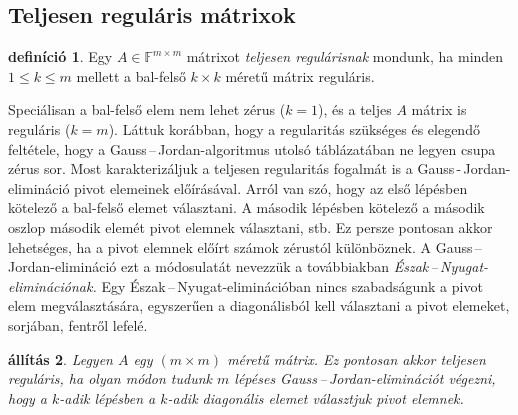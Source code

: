 \documentclass[a4paper, showtrims]{memoir}
\theoremstyle{plain}
\newtheorem{proposition}{állítás}[chapter]
\theoremstyle{remark}
\theoremstyle{definition}
\newtheorem{definition}[proposition]{definíció}
\begin{document}
\subsection{Teljesen reguláris mátrixok}
\begin{definition}\label{def:t-reg}
    Egy $A\in\mathbb{F}^{m\times m}$ mátrixot \emph{teljesen regulárisnak} mondunk,
    ha minden $1\leq k\leq m$ mellett a bal-felső $k\times k$ méretű mátrix reguláris.
\end{definition}
Speciálisan a bal-felső elem nem lehet zérus ($k=1$), és a teljes $A$ mátrix is reguláris ($k=m$).
Láttuk korábban, hogy a regularitás szükséges és elegendő feltétele, hogy a Gauss\,--\,Jordan-algoritmus utolsó táblázatában ne legyen csupa zérus sor.
Most karakterizáljuk a teljesen regularitás fogalmát is a Gauss\,-\,Jordan-elimináció pivot elemeinek előírásával.
Arról van szó, hogy az első lépésben kötelező a bal-felső elemet választani.
A második lépésben kötelező a második oszlop második elemét pivot elemnek választani, stb.
Ez persze pontosan akkor lehetséges, ha a pivot elemnek előírt számok zérustól különböznek.
A Gauss\,--\,Jordan-elimináció ezt a módosulatát nevezzük a továbbiakban 
\emph{Észak\,--\,Nyugat-eliminációnak.}
Egy Észak\,--\,Nyugat-eliminációban nincs szabadságunk a pivot elem megválasztására,
egyszerűen a diagonálisból kell választani a pivot elemeket, sorjában, fentről lefelé.
\begin{proposition}\label{pr:NW-eliminacio}
    Legyen $A$ egy $\left( m\times m \right)$ méretű mátrix.
    Ez pontosan akkor teljesen reguláris, ha olyan módon tudunk $m$ lépéses Gauss\,--\,Jordan-eliminációt végezni,
    hogy a $k$-adik lépésben a $k$-adik diagonális elemet választjuk pivot elemnek.
\end{proposition}
\end{document}
